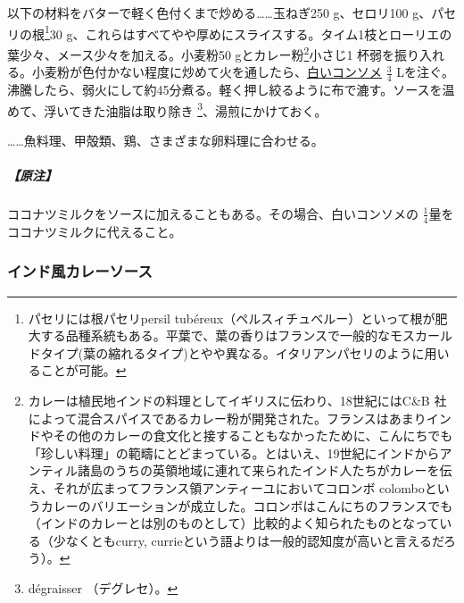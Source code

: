 \begin{recette}


以下の材料をバターで軽く色付くまで炒める\ldots{}\ldots{}玉ねぎ250
g、セロリ100 g、パセリの根\footnote{パセリには根パセリpersil
  tubéreux（ペルスィチュベルー）といって根が肥大する品種系統もある。平葉で、葉の香りはフランスで一般的なモスカールドタイプ(葉の縮れるタイプ)とやや異なる。イタリアンパセリのように用いることが可能。}30
g、これらはすべてやや厚めにスライスする。タイム1枝とローリエの葉少々、メース少々を加える。小麦粉50
gとカレー粉\footnote{カレーは植民地インドの料理としてイギリスに伝わり、18世紀にはC\&B
  社によって混合スパイスであるカレー粉が開発された。フランスはあまりインドやその他のカレーの食文化と接することもなかったために、こんにちでも「珍しい料理」の範疇にとどまっている。とはいえ、19世紀にインドからアンティル諸島のうちの英領地域に連れて来られたインド人たちがカレーを伝え、それが広まってフランス領アンティーユにおいてコロンボ
  colomboというカレーのバリエーションが成立した。コロンボはこんにちのフランスでも（インドのカレーとは別のものとして）比較的よく知られたものとなっている（少なくともcurry,
  currieという語よりは一般的認知度が高いと言えるだろう）。}小さじ1
杯弱を振り入れる。小麦粉が色付かない程度に炒めて火を通したら、\protect\hyperlink{}{白いコンソメ}
\(\frac{3}{4}\)
Lを注ぐ。沸騰したら、弱火にして約45分煮る。軽く押し絞るように布で漉す。ソースを温めて、浮いてきた油脂は取り除き
\footnote{dégraisser （デグレセ）。}、湯煎にかけておく。

\ldots{}\ldots{}魚料理、甲殻類、鶏、さまざまな卵料理に合わせる。

\hypertarget{nota-sauce-currie}{%
\subparagraph{【原注】}\label{nota-sauce-currie}}

ココナツミルクをソースに加えることもある。その場合、白いコンソメの
\(\frac{1}{4}\)量をココナツミルクに代えること。

\hypertarget{sauce-currie-indienne}{%
\subsubsection{インド風カレーソース}\label{sauce-currie-indienne}}



\end{recette}
